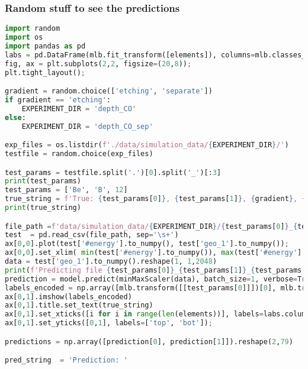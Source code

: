 \hypertarget{random-stuff-to-see-the-predictions}{%
\subsubsection{Random stuff to see the
predictions}\label{random-stuff-to-see-the-predictions}}

\begin{lstlisting}[language=Python]
import random
import os
import pandas as pd
labs = pd.DataFrame(mlb.fit_transform([elements]), columns=mlb.classes_)
fig, ax = plt.subplots(2,2, figsize=(20,8));
plt.tight_layout();

gradient = random.choice(['etching', 'separate'])
if gradient == 'etching':
    EXPERIMENT_DIR = 'depth_CO'
else:
    EXPERIMENT_DIR = 'depth_CO_sep'

exp_files = os.listdir(f'./data/simulation_data/{EXPERIMENT_DIR}/')
testfile = random.choice(exp_files)

test_params = testfile.split('.')[0].split('_')[:3]
print(test_params)
test_params = ['Be', 'B', 12]
true_string = f'True: {test_params[0]}, {test_params[1]}, {gradient}, {test_params[2]}'
print(true_string)

file_path =f'data/simulation_data/{EXPERIMENT_DIR}/{test_params[0]}_{test_params[1]}_{test_params[2]}_{gradient}_spectra.spcreg1.spc'
test  = pd.read_csv(file_path, sep='\s+')
ax[0,0].plot(test['#energy'].to_numpy(), test['geo_1'].to_numpy());
ax[0,0].set_xlim( min(test['#energy'].to_numpy()), max(test['#energy'].to_numpy()))
data = test['geo_1'].to_numpy().reshape(1, 1,2048)
print(f'Predicting file {test_params[0]}_{test_params[1]}_{test_params[2]}_{gradient}_spectra.spcreg1.spc')
prediction = model.predict(minMaxScaler(data), batch_size=1, verbose=True)
labels_encoded = np.array([mlb.transform([[test_params[0]]])[0], mlb.transform([[test_params[1]]])[0]]).reshape(2,79)
ax[0,1].imshow(labels_encoded)
ax[0,1].title.set_text(true_string)
ax[0,1].set_xticks([i for i in range(len(elements))], labels=labs.columns.values, fontdict={'fontsize': 8}); 
ax[0,1].set_yticks([0,1], labels=['top', 'bot']); 

predictions = np.array([prediction[0], prediction[1]]).reshape(2,79)

pred_string  = 'Prediction: '


\end{lstlisting}
